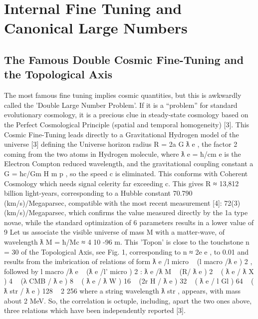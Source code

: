 
\chapter{Internal Fine Tuning and Canonical Large Numbers}
\label{chap:chapter_1}


\section{The Famous Double Cosmic Fine-Tuning and the Topological Axis}
\label{sec:examples}

The most famous fine tuning implies cosmic quantities, but this is awkwardly called the 'Double
Large Number Problem'. If it is a “problem” for standard evolutionary cosmology, it is a precious
clue in steady-state cosmology based on the Perfect Cosmological Principle (spatial and temporal
homogeneity) [3].
This Cosmic Fine-Tuning leads directly to a Gravitational Hydrogen model of the universe [3]
defining the Universe horizon radius R = 2a G ƛ e , the factor 2 coming from the two atoms in
Hydrogen molecule, where ƛ e = ħ/cm e is the Electron Compton reduced wavelength, and the
gravitational coupling constant a G = ħc/Gm H m p , so the speed c is eliminated. This conforms with
Coherent Cosmology which needs signal celerity far exceeding c. This gives R ≈ 13,812 billion
light-years, corresponding to a Hubble constant 70.790 (km/s)/Megaparsec, compatible with the
most recent measurement [4]: 72(3) (km/s)/Megaparsec, which confirms the value measured
directly by the 1a type novae, while the standard optimization of 6 parameters results in a lower
value of 9 %
Let us associate the visible universe of mass M with a matter-wave, of wavelength ƛ M = ħ/Mc ≈ 4
10 -96 m. This 'Topon' is close to the touchstone n = 30 of the Topological Axis, see Fig. 1,
corresponding to n ≈ 2e e , to 0.01 %
and results from the imbrication of relations of form ƛ e /l micro ~ (l macro /ƛ e ) 2 , followed by l macro /ƛ e ~
(ƛ e /l' micro ) 2 :
ƛ e /ƛ M ~ (R/ ƛ e ) 2 ~ ( ƛ e / ƛ X ) 4 ~ (λ CMB / ƛ e ) 8 ~ ( ƛ e / ƛ W ) 16 ~ (2r H / ƛ e ) 32 ~ ( ƛ e / l Gl ) 64 ~ ( ƛ str / ƛ e ) 128 ~ 2 256
where a string wavelength ƛ str , appears, with mass about 2 MeV. So, the correlation is octuple,
including, apart the two ones above, three relations which have been independently reported [3].
